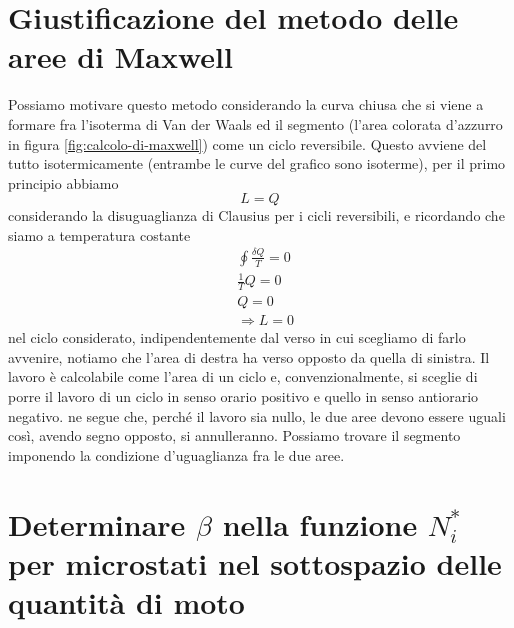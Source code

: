 \documentclass[
10pt, %
a4paper, %
oneside, %
headinclude,footinclude, %
BCOR5mm, %
]{scrartcl}
\begin{document}
\section{Giustificazione del metodo delle aree di Maxwell}
Possiamo motivare questo metodo considerando la curva chiusa che si viene a formare fra l'isoterma di Van der Waals ed il segmento (l'area colorata d'azzurro in figura \ref{fig:calcolo-di-maxwell}) come un ciclo reversibile. Questo avviene del tutto isotermicamente (entrambe le curve del grafico sono isoterme), per il primo principio abbiamo
\[L = Q\]
considerando la disuguaglianza di Clausius per i cicli reversibili, e ricordando che siamo a temperatura costante
\begin{align*}
	&\oint\frac{\delta Q}{T}= 0\\
	&\frac{1}{T}Q=0\\
	&Q=0\\
	&\Rightarrow L=0
\end{align*} 
nel ciclo considerato, indipendentemente dal verso in cui scegliamo di farlo avvenire, notiamo che l'area di destra ha verso opposto da quella di sinistra. Il lavoro è calcolabile come l'area di un ciclo e, convenzionalmente, si sceglie di porre il lavoro di un ciclo in senso orario positivo e quello in senso antiorario negativo. ne segue che, perché il lavoro sia nullo, le due aree devono essere uguali così, avendo segno opposto, si annulleranno. Possiamo trovare il segmento imponendo la condizione d'uguaglianza fra le due aree.  
\section{Determinare $\beta$ nella funzione \(N_i^*\) per microstati nel sottospazio delle quantità di moto}
\end{document}
